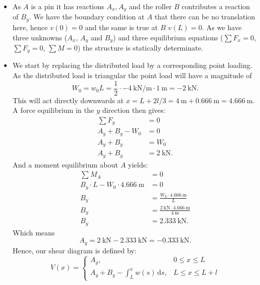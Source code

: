 \begin{derivation}
  \begin{itemize}
    \item[Q2.1] As $A$ is a pin it has reactions $A_x, A_y$ and the roller $B$ contributes a reaction of $B_y$. We have the boundary condition at $A$ that there can be no translation here, hence $v(0 ) = 0$ and the same is true at $B$ $v(L) = 0$. As we have three unknowns ($A_x$, $A_y$ and $B_y$) and three equilibrium equations ($\sum F_x = 0$, $\sum F_y = 0$, $\sum M = 0$) the structure is statically determinate.
    \item[Q2.2] We start by replacing the distributed load by a corresponding point loading.
      As the distributed load is triangular the point load will have a magnitude of
      \begin{equation*}
        W_0 = w_0 L = \frac{1}{2} \cdot  \qty{-4}{\kN\per\m} \cdot \qty{1}{\m} = \qty{-2}{\kN} 
      .\end{equation*}
      This will act directly downwards at $x = L + 2l / 3 = \qty{4}{\m} + \qty{0,666}{\m} = \qty{4,666}{\m}$.
      A force equilibrium in the $y$ direction then gives:
      \begin{align*}
        \sum F_y &= 0 \\
        A_y + B_y - W_0 &= 0 \\
        A_y + B_y &= W_0 \\
        A_y + B_y &= \qty{2}{\kN}
      .\end{align*}
      And a moment equilibrium about $A$ yields:
      \begin{align*}
        \sum M_A &= 0 \\
        B_y \cdot L - W_0 \cdot \qty{4,666}{\m} &= 0 \\
        B_y &= \frac{W_0 \cdot \qty{4,666}{\m} }{L} \\
        B_y &= \frac{\qty{2}{\kN} \cdot \qty{4,666}{\m} }{\qty{4}{\m} } \\  
        B_y &= \qty{ 2,333}{\kN} 
      .\end{align*}
      Which means
      \begin{equation*}
        A_y = \qty{2}{\kN} - \qty{2,333}{\kN} = -\qty{0,333}{\kN} 
      .\end{equation*}
      Hence, our shear diagram is defined by:
      \begin{equation*}
        V(x) = \begin{cases}
          A_y, & 0 \leq x \leq L\\
        A_y + B_y - \int_{L}^{x} w(s) \, \mathrm{d}s,  & L\leq x \leq L + l

\end{cases}
\end{equation*}
\end{itemize}
\end{derivation}
